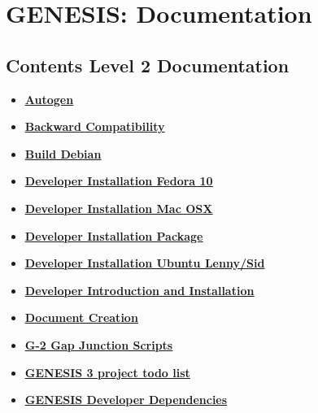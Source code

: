 \documentclass[12pt]{article}
\begin{document}
\section*{GENESIS: Documentation}

\subsection*{Contents Level 2 Documentation}

\begin{itemize}

\item \href{../autogen/autogen.pdf}{\bf \underline{Autogen}}

\item \href{../backward-compatibility/backward-compatibility.pdf}{\bf \underline{Backward Compatibility}}

\item \href{../build-debian/build-debian.pdf}{\bf \underline{Build Debian}}

\item \href{../installation-fedora10/installation-fedora10.pdf}{\bf \underline{Developer Installation Fedora 10}}

\item \href{../installation-osx/installation-osx.pdf}{\bf \underline{Developer Installation Mac OSX}}

\item \href{../developer-package/developer-package.pdf}{\bf \underline{Developer Installation Package}}

\item \href{../installation-ubuntu-lennysid/installation-ubuntu-lennysid.pdf}{\bf \underline{Developer Installation Ubuntu Lenny/Sid}}

\item \href{../developers-intro/developers-intro.pdf}{\bf \underline{Developer Introduction and Installation}}

\item \href{../document-create/document-create.pdf}{\bf \underline{Document Creation}}

\item \href{../g2-gap-junction/g2-gap-junction.pdf}{\bf \underline{G-2 Gap Junction Scripts}}

\item \href{../project-todo/project-todo.pdf}{\bf \underline{GENESIS 3 project todo list}}

\item \href{../genesis-dependencies/genesis-dependencies.pdf}{\bf \underline{GENESIS Developer Dependencies}}


\end{itemize}
\end{document}
